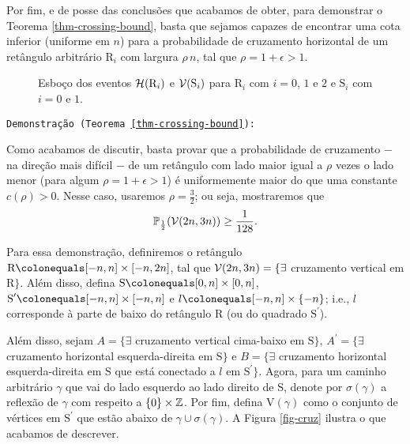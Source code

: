 \par Por fim, e de posse das conclusões que acabamos de obter, para demonstrar o Teorema \ref{thm-crossing-bound}, basta que sejamos capazes de encontrar uma cota inferior (uniforme em $n$) para a probabilidade de cruzamento horizontal de um retângulo arbitrário $\text{R}_i$ com largura $\rho\,n$, tal que $\rho = 1 + \epsilon > 1$.

\begin{figure*}[!htbp]
	\centering
	
	\vspace{-12pt}
	\caption{Esboço dos eventos $\operatorname{\mathcal{H}}(\text{R}_i)$ e $\operatorname{\mathcal{V}}(\text{S}_i)$ para $\text{R}_i$ com $i = 0$, $1$ e $2$ e $\text{S}_i$ com $i = 0$ e $1$.}
	\label{fig-ris}
\end{figure*}

\par \texttt{Demonstração (Teorema \ref{thm-crossing-bound}):}

\par Como acabamos de discutir, basta provar que a probabilidade de cruzamento $-$ na direção mais difícil $-$ de um retângulo com lado maior igual a $\rho$ vezes o lado menor (para algum $\rho = 1 + \epsilon > 1$) é uniformemente maior do que uma constante $c(\rho) > 0$. Nesse caso, usaremos $\rho = \frac{3}{2}$; ou seja, mostraremos que
\begin{align*}
	\operatorname{\mathbb{P}}_{\frac{1}{2}}(\operatorname{\mathcal{V}}(2n, 3n)) \geq \frac{1}{128}.
\end{align*} 

\par Para essa demonstração, definiremos o retângulo $\text{R} \colonequals [-n, n] \times [-n, 2n]$, tal que $\operatorname{\mathcal{V}}(2n, 3n) = \{\exists$ cruzamento vertical em $\text{R}\}$. Além disso, defina $\text{S} \colonequals [0, n] \times [0, n]$, $\text{S}^{\prime} \colonequals [-n, n] \times [-n, n]$ e $l \colonequals [-n, n] \times \{-n\}$; i.e., $l$ corresponde à parte de baixo do retângulo $\text{R}$ (ou do quadrado $\text{S}^{\prime}$).

\par Além disso, sejam $A = \{\exists$ cruzamento vertical cima-baixo em $\text{S}\}$, $A^{\prime} = \{\exists$ cruzamento horizontal esquerda-direita em $\text{S}\}$ e $B = \{\exists$ cruzamento horizontal esquerda-direita em $\text{S}$ que está conectado a $l$ em $\text{S}^{\prime}\}$. Agora, para um caminho arbitrário $\gamma$ que vai do lado esquerdo ao lado direito de $\text{S}$, denote por $\sigma(\gamma)$ a reflexão de $\gamma$ com respeito a $\{0\} \times \operatorname{\mathbb{Z}}$. Por fim, defina $\text{V}(\gamma)$ como o conjunto de vértices em $\text{S}^{\prime}$ que estão abaixo de $\gamma \cup \sigma(\gamma)$. A Figura \ref{fig-cruz} ilustra o que acabamos de descrever.

